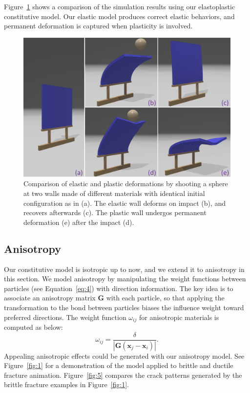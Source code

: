 Figure~\ref{fig:4} shows a comparison of the simulation results using our elastoplastic constitutive model. Our elastic model produces correct elastic behaviors, and permanent deformation is captured when plasticity is involved.
\begin{figure}[t]
  \centering
  \includegraphics[width=\linewidth]{./figs/demo_impact_upside.png}
  \caption{\label{fig:4}
  Comparison of elastic and plastic deformations by shooting a sphere at two walls made of different materials with identical initial configuration as in (a). The elastic wall deforms on impact (b), and recovers afterwards (c). The plastic wall undergos permanent deformation (e) after the impact (d).
}
\end{figure}

\subsection{Anisotropy}

Our constitutive model is isotropic up to now, and we extend it to anisotropy in this section. We model anisotropy by manipulating the weight functions between particles (see Equation~\ref{eq:4}) with direction information. The key idea is to associate an anisotropy matrix $\mathbf{G}$ with each particle, so that applying the transformation to the bond between particles biases the influence weight toward preferred directions. The weight function $\omega_{ij}$ for anisotropic materials is computed as below:
\begin{equation}
\omega_{ij}=\frac{\delta}{|\mathbf{G}(\mathbf{x}_j-\mathbf{x}_i)|}.
\label{eq:16}
\end{equation}
Appealing anisotropic effects could be generated with our anisotropy model. See Figure~\ref{fig:1} for a demonstration of the model applied to brittle and ductile fracture animation. Figure~\ref{fig:5} compares the crack patterns generated by the brittle fracture examples in Figure~\ref{fig:1}.

